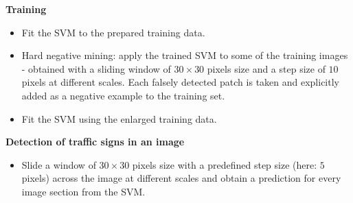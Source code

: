 \documentclass[a0paper,portrait]{baposter}
\begin{document}
\begin{poster}
{\textbf{Training}
\begin{itemize}
	\setlength\itemsep{0em}
	\item Fit the SVM to the prepared training data.
	\item Hard negative mining: apply the trained SVM to some of the training images - obtained with a sliding window of $30 \times 30$ pixels size and a step size of $10$ pixels at different scales. Each falsely detected patch is taken and explicitly added as a negative example to the training set.
	\item Fit the SVM using the enlarged training data.
\end{itemize}

\textbf{Detection of traffic signs in an image}
\begin{itemize}
	\setlength\itemsep{0em}
	\item Slide a window of $30 \times 30$ pixels size with a predefined step size (here: $5$ pixels) across the image at different scales and obtain a prediction for every image section from the SVM.
\end{itemize}

}






\end{poster}
\end{document}
